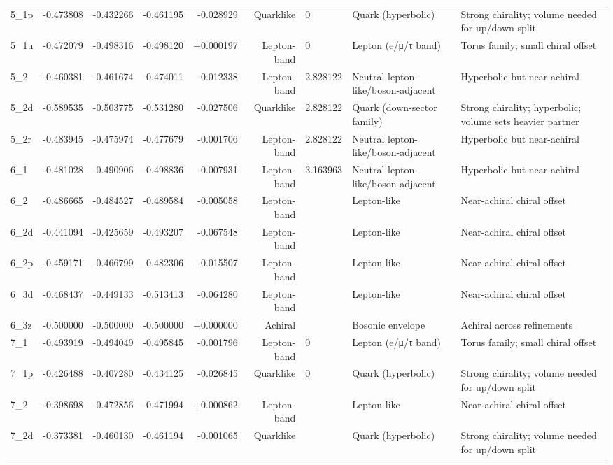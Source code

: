 \documentclass[smallextended]{svjour3}       %
\begin{document}
\begin{longtable}{lrrrrrllp{6.8cm}}
    5\_1p & -0.473808 & -0.432266 & -0.461195 & -0.028929 & Quarklike & 0 & Quark (hyperbolic) & Strong chirality; volume needed for up/down split \\
    5\_1u & -0.472079 & -0.498316 & -0.498120 & +0.000197 & Lepton-band & 0 & Lepton (e/μ/τ band) & Torus family; small chiral offset \\
    5\_2 & -0.460381 & -0.461674 & -0.474011 & -0.012338 & Lepton-band & 2.828122 & Neutral lepton-like/boson-adjacent & Hyperbolic but near-achiral \\
    5\_2d & -0.589535 & -0.503775 & -0.531280 & -0.027506 & Quarklike & 2.828122 & Quark (down-sector family) & Strong chirality; hyperbolic; volume sets heavier partner \\
    5\_2r & -0.483945 & -0.475974 & -0.477679 & -0.001706 & Lepton-band & 2.828122 & Neutral lepton-like/boson-adjacent & Hyperbolic but near-achiral \\
    6\_1 & -0.481028 & -0.490906 & -0.498836 & -0.007931 & Lepton-band & 3.163963 & Neutral lepton-like/boson-adjacent & Hyperbolic but near-achiral \\
    6\_2 & -0.486665 & -0.484527 & -0.489584 & -0.005058 & Lepton-band &  & Lepton-like & Near-achiral chiral offset \\
    6\_2d & -0.441094 & -0.425659 & -0.493207 & -0.067548 & Lepton-band &  & Lepton-like & Near-achiral chiral offset \\
    6\_2p & -0.459171 & -0.466799 & -0.482306 & -0.015507 & Lepton-band &  & Lepton-like & Near-achiral chiral offset \\
    6\_3d & -0.468437 & -0.449133 & -0.513413 & -0.064280 & Lepton-band &  & Lepton-like & Near-achiral chiral offset \\
    6\_3z & -0.500000 & -0.500000 & -0.500000 & +0.000000 & Achiral &  & Bosonic envelope & Achiral across refinements \\
    7\_1 & -0.493919 & -0.494049 & -0.495845 & -0.001796 & Lepton-band & 0 & Lepton (e/μ/τ band) & Torus family; small chiral offset \\
    7\_1p & -0.426488 & -0.407280 & -0.434125 & -0.026845 & Quarklike & 0 & Quark (hyperbolic) & Strong chirality; volume needed for up/down split \\
    7\_2 & -0.398698 & -0.472856 & -0.471994 & +0.000862 & Lepton-band &  & Lepton-like & Near-achiral chiral offset \\
    7\_2d & -0.373381 & -0.460130 & -0.461194 & -0.001065 & Quarklike &  & Quark (hyperbolic) & Strong chirality; volume needed for up/down split \\

\end{longtable}
\end{document}

